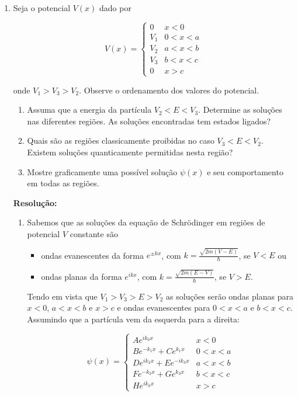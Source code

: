 \documentclass[a4paper, 12pt, notitlepage]{article}
\begin{document}
\begin{enumerate}
\item Seja o potencial $V(x)$ dado por

\begin{equation*}
  V(x) = 
  \begin{cases}
  0 & x < 0 \\
  V_1 & 0 < x < a \\
  V_2 & a < x < b \\
  V_3 & b < x < c \\
  0 & x > c
  \end{cases}
\end{equation*}

\noindent onde $V_1 > V_3 > V_2$. Observe o ordenamento dos valores do potencial.

\begin{enumerate}
  \item Assuma que a energia da partícula $V_2 < E < V_3$. Determine as soluções nas diferentes regiões. As soluções encontradas tem estados ligados?
  \item Quais são as regiões classicamente proibidas no caso $V_3 < E < V_2$. Existem soluções quanticamente permitidas nesta região?
  \item Mostre graficamente uma possível solução $\psi(x)$ e seu comportamento em todas as regiões.
\end{enumerate}

\textbf{Resolução: }
\begin{enumerate}
  \item Sabemos que as soluções da equação de Schrödinger em regiões de potencial $V$ constante são
  \begin{itemize}
    \item ondas evanescentes da forma $e^{\pm k x}$, com $k = \frac{\sqrt{2m(V - E)}}{\hbar}$, se $V < E$ ou
    \item ondas planas da forma $e^{ikx}$, com $k = \frac{\sqrt{2m(E-V)}}{\hbar}$, se $V > E$.
  \end{itemize}
  Tendo em vista que $V_1 > V_3 > E > V_2$ as soluções serão ondas planas para $x < 0$, $a < x < b$ e $x > c$ e ondas evanescentes para $0 < x < a$ e $b < x < c$. Assumindo que a partícula vem da esquerda para a direita:
  
  \begin{equation*}
  \psi(x) = 
    \begin{cases}
      A e^{ik_0x} & x < 0 \\
      B e^{-k_1x} + Ce^{k_1 x} & 0 < x < a \\
      D e^{ik_2x} + E e^{-ik_3 x} & a < x < b \\
      F e^{-k_3x} + G e^{k_3 x} & b < x < c \\
      H e^{ik_0x} & x > c
    \end{cases}
  \end{equation*}
  

\end{enumerate}
\end{enumerate}
\end{document}
